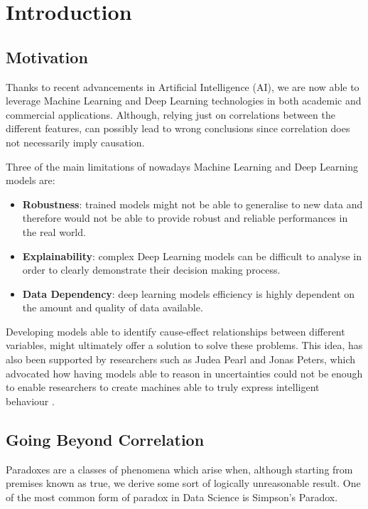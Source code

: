 \chapter{Introduction}
\section{Motivation}
\vspace{-0.1cm}
Thanks to recent advancements in Artificial Intelligence (AI), we are now able to leverage Machine Learning and Deep Learning technologies in both academic and commercial applications. Although, relying just on correlations between the different features, can possibly lead to wrong conclusions since correlation does not necessarily imply causation.

Three of the main limitations of nowadays Machine Learning and Deep Learning models are: 
\vspace{-0.2cm}
\begin{itemize}
    \item \textbf{Robustness}: trained models might not be able to generalise to new data and therefore would not be able to provide robust and reliable performances in the real world.
    \item \textbf{Explainability}: complex Deep Learning models can be difficult to analyse in order to clearly demonstrate their decision making process. 
    \item \textbf{Data Dependency}: deep learning models efficiency is highly dependent on the amount and quality of data available. 
\end{itemize}
\vspace{-0.2cm}
Developing models able to identify cause-effect relationships between different variables, might ultimately offer a solution to solve these problems. This idea, has also been supported by researchers such as Judea Pearl and Jonas Peters, which advocated how having models able to reason in uncertainties could not be enough to enable researchers to create machines able to truly express intelligent behaviour \cite{art_perl}.

\section{Going Beyond Correlation}
Paradoxes are a classes of phenomena which arise when, although starting from premises known as true, we derive some sort of logically unreasonable result. One of the most common form of paradox in Data Science is Simpson's Paradox.

